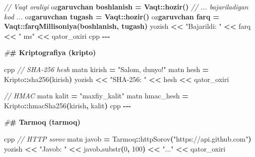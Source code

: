 \documentclass[a4paper,11pt,twoside,openright]{book}
\newenvironment{Shaded}{\begin{snugshade}}{\end{snugshade}}
\newcommand{\CharTok}[1]{\textcolor[rgb]{0.31,0.60,0.02}{#1}}
\newcommand{\CommentTok}[1]{\textcolor[rgb]{0.56,0.35,0.01}{\textit{#1}}}
\newcommand{\DecValTok}[1]{\textcolor[rgb]{0.00,0.00,0.81}{#1}}
\newcommand{\ErrorTok}[1]{\textcolor[rgb]{0.64,0.00,0.00}{\textbf{#1}}}
\newcommand{\NormalTok}[1]{#1}
\newcommand{\OperatorTok}[1]{\textcolor[rgb]{0.81,0.36,0.00}{\textbf{#1}}}
\newcommand{\PreprocessorTok}[1]{\textcolor[rgb]{0.56,0.35,0.01}{\textit{#1}}}
\newcommand{\StringTok}[1]{\textcolor[rgb]{0.31,0.60,0.02}{#1}}
\begin{document}
\begin{Shaded}
\begin{Highlighting}[]
\CommentTok{// Vaqt oralig\textquotesingle{}i}
\NormalTok{o}\CharTok{\textquotesingle{}z}\ErrorTok{garuvchan boshlanish = Vaqt::hozir()}
\CommentTok{// ... bajariladigan kod ...}
\NormalTok{o}\CharTok{\textquotesingle{}z}\ErrorTok{garuvchan tugash = Vaqt::hozir()}
\NormalTok{o}\CharTok{\textquotesingle{}z}\ErrorTok{garuvchan farq = Vaqt::farqMillisoniya(boshlanish, tugash)}
\NormalTok{yozish }\OperatorTok{\textless{}\textless{}} \StringTok{"Bajarildi: "} \OperatorTok{\textless{}\textless{}}\NormalTok{ farq }\OperatorTok{\textless{}\textless{}} \StringTok{" ms"} \OperatorTok{\textless{}\textless{}}\NormalTok{ qator\_oxiri}
\ErrorTok{\textasciigrave{}\textasciigrave{}\textasciigrave{}}\NormalTok{cpp}
\OperatorTok{{-}{-}{-}}

\PreprocessorTok{\#}\ErrorTok{\# Kriptografiya (\textasciigrave{}kripto\textasciigrave{})}

\ErrorTok{\textasciigrave{}\textasciigrave{}\textasciigrave{}}\NormalTok{cpp}
\CommentTok{// SHA{-}256 hesh}
\NormalTok{matn kirish }\OperatorTok{=} \StringTok{"Salom, dunyo!"}
\NormalTok{matn hesh }\OperatorTok{=}\NormalTok{ Kripto}\OperatorTok{::}\NormalTok{sha256}\OperatorTok{(}\NormalTok{kirish}\OperatorTok{)}
\NormalTok{yozish }\OperatorTok{\textless{}\textless{}} \StringTok{"SHA{-}256: "} \OperatorTok{\textless{}\textless{}}\NormalTok{ hesh }\OperatorTok{\textless{}\textless{}}\NormalTok{ qator\_oxiri}

\CommentTok{// HMAC}
\NormalTok{matn kalit }\OperatorTok{=} \StringTok{"maxfiy\_kalit"}
\NormalTok{matn hmac\_hesh }\OperatorTok{=}\NormalTok{ Kripto}\OperatorTok{::}\NormalTok{hmacSha256}\OperatorTok{(}\NormalTok{kirish}\OperatorTok{,}\NormalTok{ kalit}\OperatorTok{)}
\ErrorTok{\textasciigrave{}\textasciigrave{}\textasciigrave{}}\NormalTok{cpp}
\OperatorTok{{-}{-}{-}}

\PreprocessorTok{\#}\ErrorTok{\# Tarmoq (\textasciigrave{}tarmoq\textasciigrave{})}

\ErrorTok{\textasciigrave{}\textasciigrave{}\textasciigrave{}}\NormalTok{cpp}
\CommentTok{// HTTP so\textquotesingle{}rov}
\NormalTok{matn javob }\OperatorTok{=}\NormalTok{ Tarmoq}\OperatorTok{::}\NormalTok{httpSorov}\OperatorTok{(}\StringTok{"https://api.github.com"}\OperatorTok{)}
\NormalTok{yozish }\OperatorTok{\textless{}\textless{}} \StringTok{"Javob: "} \OperatorTok{\textless{}\textless{}}\NormalTok{ javob}\OperatorTok{.}\NormalTok{substr}\OperatorTok{(}\DecValTok{0}\OperatorTok{,} \DecValTok{100}\OperatorTok{)} \OperatorTok{\textless{}\textless{}} \StringTok{"..."} \OperatorTok{\textless{}\textless{}}\NormalTok{ qator\_oxiri}


\end{Highlighting}
\end{Shaded}
\end{document}
